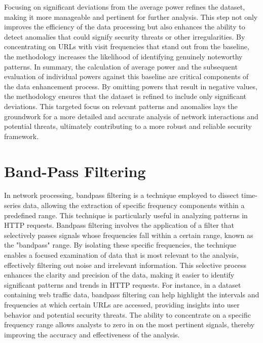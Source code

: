 Focusing on significant deviations from the average power refines the dataset, making it more manageable and pertinent for further analysis. This step not only improves the efficiency of the data processing but also enhances the ability to detect anomalies that could signify security threats or other irregularities. By concentrating on URLs with visit frequencies that stand out from the baseline, the methodology increases the likelihood of identifying genuinely noteworthy patterns. In summary, the calculation of average power and the subsequent evaluation of individual powers against this baseline are critical components of the data enhancement process. By omitting powers that result in negative values, the methodology ensures that the dataset is refined to include only significant deviations. This targeted focus on relevant patterns and anomalies lays the groundwork for a more detailed and accurate analysis of network interactions and potential threats, ultimately contributing to a more robust and reliable security framework.

\section{Band-Pass Filtering}
In network processing, bandpass filtering is a technique employed to dissect time-series data, allowing the extraction of specific frequency components within a predefined range. This technique is particularly useful in analyzing patterns in HTTP requests. Bandpass filtering involves the application of a filter that selectively passes signals whose frequencies fall within a certain range, known as the "bandpass" range. By isolating these specific frequencies, the technique enables a focused examination of data that is most relevant to the analysis, effectively filtering out noise and irrelevant information. This selective process enhances the clarity and precision of the data, making it easier to identify significant patterns and trends in HTTP requests. For instance, in a dataset containing web traffic data, bandpass filtering can help highlight the intervals and frequencies at which certain URLs are accessed, providing insights into user behavior and potential security threats. The ability to concentrate on a specific frequency range allows analysts to zero in on the most pertinent signals, thereby improving the accuracy and effectiveness of the analysis.


